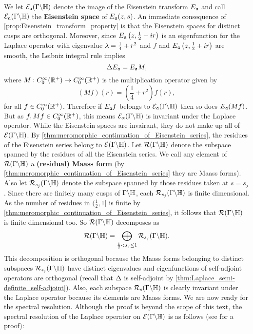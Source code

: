       We let $\mathcal{E}_{\mathfrak{a}}(\Gamma\backslash\mathbb{H})$ denote the image of the Eisenstein transform $E_{\mathfrak{a}}$ and call $\mathcal{E}_{\mathfrak{a}}(\Gamma\backslash\mathbb{H})$ the \textbf{Eisenstein space} of $E_{\mathfrak{a}}(z,s)$. An immediate consequence of \cref{prop:Eisenstein_transform_property} is that the Eisenstein spaces for distinct cusps are orthogonal. Moreover, since $E_{\mathfrak{a}}\left(z,\frac{1}{2}+ir\right)$ is an eigenfunction for the Laplace operator with eigenvalue $\lambda = \frac{1}{4}+r^{2}$ and $f$ and $E_{\mathfrak{a}}\left(z,\frac{1}{2}+ir\right)$ are smooth, the Leibniz integral rule implies
      \[
        \Delta E_{\mathfrak{a}}= E_{\mathfrak{a}}M,
      \]
      where $M:C_{0}^{\infty}(\mathbb{R}^{+}) \to C_{0}^{\infty}(\mathbb{R}^{+})$ is the multiplication operator given by
      \[
        (Mf)(r) = \left(\frac{1}{4}+r^{2}\right)f(r),
      \]
      for all $f \in C_{0}^{\infty}(\mathbb{R}^{+})$. Therefore if $E_{\mathfrak{a}}f$ belongs to $\mathcal{E}_{\mathfrak{a}}(\Gamma\backslash\mathbb{H})$ then so does $E_{\mathfrak{a}}(Mf)$. But as $f,Mf \in C_{0}^{\infty}(\mathbb{R}^{+})$, this means $\mathcal{E}_{\alpha}(\Gamma\backslash\mathbb{H})$ is invariant under the Laplace operator. While the Eisenstein spaces are invairant, they do not make up all of $\mathcal{E}(\Gamma\backslash\mathbb{H})$. By \cref{thm:meromorphic_continuation_of_Eisenstein_series}, the residues of the Eisenstein series belong to $\mathcal{E}(\Gamma\backslash\mathbb{H})$. Let $\mathcal{R}(\Gamma\backslash\mathbb{H})$ denote the subspace spanned by the residues of all the Eisenstein series. We call any element of $\mathcal{R}(\Gamma\backslash\mathbb{H})$ a \textbf{(residual) Maass form} (by \cref{thm:meromorphic_continuation_of_Eisenstein_series} they are Maass forms). Also let $\mathcal{R}_{s_{j}}(\Gamma\backslash\mathbb{H})$ denote the subspace spanned by those residues taken at $s = s_{j}$. Since there are finitely many cusps of $\Gamma\backslash\mathbb{H}$, each $\mathcal{R}_{s_{j}}(\Gamma\backslash\mathbb{H})$ is finite dimensional. As the number of residues in $(\frac{1}{2},1]$ is finite by \cref{thm:meromorphic_continuation_of_Eisenstein_series}, it follows that $\mathcal{R}(\Gamma\backslash\mathbb{H})$ is finite dimensional too. So $\mathcal{R}(\Gamma\backslash\mathbb{H})$ decomposes as
      \[
        \mathcal{R}(\Gamma\backslash\mathbb{H}) = \bigoplus_{\frac{1}{2} < s_{j} \le 1}\mathcal{R}_{s_{j}}(\Gamma\backslash\mathbb{H}).
      \]
      This decomposition is orthogonal because the Maass forms belonging to distinct subspaces $\mathcal{R}_{s_{j}}(\Gamma\backslash\mathbb{H})$ have distinct eigenvalues and eigenfunctions of self-adjoint operators are orthogonal (recall that $\Delta$ is self-adjoint by \cref{thm:Laplace_semi-definite_self-adjoint}). Also, each subspace $\mathcal{R}_{s}(\Gamma\backslash\mathbb{H})$ is clearly invariant under the Laplace operator because its elements are Maass forms.
      We are now ready for the spectral resolution. Although the proof is beyond the scope of this text, the spectral resolution of the Laplace operator on $\mathcal{E}(\Gamma\backslash\mathbb{H})$ is as follows (see \cite{iwaniec2021spectral} for a proof):

